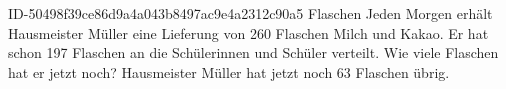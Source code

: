 \begin{exercise}
      {ID-50498f39ce86d9a4a043b8497ac9e4a2312c90a5}
      {Flaschen}
  \ifproblem\problem
    Jeden Morgen erhält Hausmeister Müller eine Lieferung von \num{260} Flaschen
    Milch und Kakao. Er hat schon \num{197} Flaschen an die Schülerinnen und Schüler
    verteilt. Wie viele Flaschen hat er jetzt noch?
  \fi
  \ifoutcome\outcome
    Hausmeister Müller hat jetzt noch \num{63} Flaschen übrig.
  \fi
\end{exercise}
